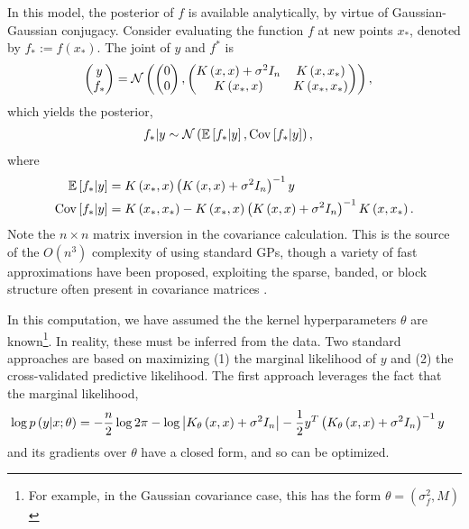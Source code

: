 \documentclass[14pt]{extreport}
\begin{document}
In this model, the posterior of $f$ is available analytically, by virtue of
Gaussian-Gaussian conjugacy. Consider evaluating the function $f$ at new points
$x_{\ast}$, denoted by $f_{\ast} := f\left(x_{\ast}\right)$. The joint of $y$
and $f^{\ast}$ is
\begin{align*}
  \begin{pmatrix}
    y \\ f_{\ast}
  \end{pmatrix} &= \mathcal{N}\left(
 \begin{pmatrix}
   0 \\ 0
 \end{pmatrix} ,
\begin{pmatrix}
  K\left(x, x\right) + \sigma^{2}I_{n} & K\left(x, x_{\ast}\right) \\
  K\left(x_{\ast}, x\right) & K\left(x_{\ast}, x_{\ast}\right)
\end{pmatrix}
  \right),
\end{align*}
which yields the posterior,
\begin{align*}
  f_{\ast} \vert y &\sim \mathcal{N}\left(\mathbb{E}\left[{f_{\ast} \vert y}\right], \mathrm{Cov}\left[{f_{\ast} \vert y}\right]\right),
\end{align*}
where
\begin{align*}
  \mathbb{E}\left[{f_{\ast} \vert y}\right] &= K\left(x_{\ast}, x\right)\left(K\left(x, x\right) + \sigma^{2}I_{n}\right)^{-1}y \\
  \mathrm{Cov}\left[{f_{\ast} \vert y}\right] &= K\left(x_{\ast}, x_{\ast}\right) - K\left(x_{\ast}, x\right)\left(K\left(x, x\right) + \sigma^{2}I_{n}\right)^{-1}K\left(x, x_{\ast}\right).
\end{align*}
Note the $n\times n$ matrix inversion in the covariance calculation. This is the
source of the $O\left(n^{3}\right)$ complexity of using standard GPs, though a
variety of fast approximations have been proposed, exploiting the sparse,
banded, or block structure often present in covariance matrices
\citep{quinonero2007approximation}.

In this computation, we have assumed the the kernel hyperparameters $\theta$ are
known\footnote{For example, in the Gaussian covariance case, this has the form
  $\theta = \left(\sigma_{f}^{2}, M\right)$}. In reality, these must be inferred
from the data. Two standard approaches are based on maximizing (1) the marginal
likelihood of $y$ and (2) the cross-validated predictive likelihood. The first
approach leverages the fact that the marginal likelihood,
\begin{align*}
\log p\left(y \vert x; \theta\right) &= -\frac{n}{2}\log 2\pi - \log\left|K_{\theta}\left(x, x\right) + \sigma^{2}I_{n}\right| - \frac{1}{2}y^{T}\left(K_{\theta}\left(x, x\right) + \sigma^{2}I_{n}\right)^{-1}y
\end{align*}
and its gradients over $\theta$ have a closed form, and so can be optimized.
\end{document}
